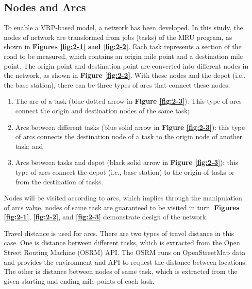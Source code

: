 \documentclass[numbered]{trbunofficial}
\begin{document}
\subsection{Nodes and Arcs}
To enable a VRP-based model, a network has been developed. In this study, the nodes of network are transformed from jobs (tasks) of the MRU program, as shown in \textbf{Figures \ref{fig:2-1} and \ref{fig:2-2}}. Each task represents a section of the road to be measured, which contains an origin mile point and a destination mile point. The origin point and destination point are converted into different nodes in the network, as shown in \textbf{Figure \ref{fig:2-2}}. With these nodes and the depot (i.e., the base station), there can be three types of arcs that connect these nodes:
\begin{enumerate}
    \item The arc of a task (blue dotted arrow in \textbf{Figure \ref{fig:2-3}}): This type of arcs connect the origin and destination nodes of the same task;
    \item Arcs between different tasks (blue solid arrow in \textbf{Figure \ref{fig:2-3}}): this type of arcs connects the destination node of a task to the origin node of another task; and
    \item Arcs between tasks and depot (black solid arrow in \textbf{Figure \ref{fig:2-3}}): this type of arcs connect the depot (i.e., base station) to the origin of tasks or from the destination of tasks. 
\end{enumerate}

Nodes will be visited according to arcs, which implies through the manipulation of arcs value, nodes of same
task are guaranteed to be visited in turn. \textbf{Figures \ref{fig:2-1}}, \textbf{\ref{fig:2-2}}, and \textbf{\ref{fig:2-3}} demonstrate design of the network.

Travel distance is used for arcs. There are two types of travel distance in this case. One is distance between different tasks, which is extracted from the Open Street Routing Machine (OSRM) API. The OSRM runs on OpenStreetMap data and provides the environment and API to request the distance between locations. The other is distance between nodes of same task, which is extracted from the given starting and ending mile points of each task.
\end{document}

